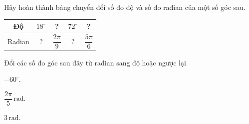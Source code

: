 \begin{bt}%

	Hãy hoàn thành bảng chuyển đổi số đo độ và số đo rađian của một số góc sau.
	\begin{center}
		\begin{longtable}{|c|c|c|c|c|}
			\hline
			Độ & $18^\circ$ & ? & $72^\circ$ & ? \\
			\hline
			Radian & ? & $\dfrac{2\pi}{9}$ & ? & $\dfrac{5\pi}{6}$\\
			\hline
		\end{longtable}
	\end{center}
\end{bt}

\begin{bt}%

	Đổi các số đo góc sau đây từ rađian sang độ hoặc ngược lại
	\begin{listEX}[3]
		\item $-60^{\circ}$.
		\item $\dfrac{2 \pi}{5}\, \mathrm{rad}$.
		\item $3\, \mathrm{rad}$.
	\end{listEX}
\end{bt}

